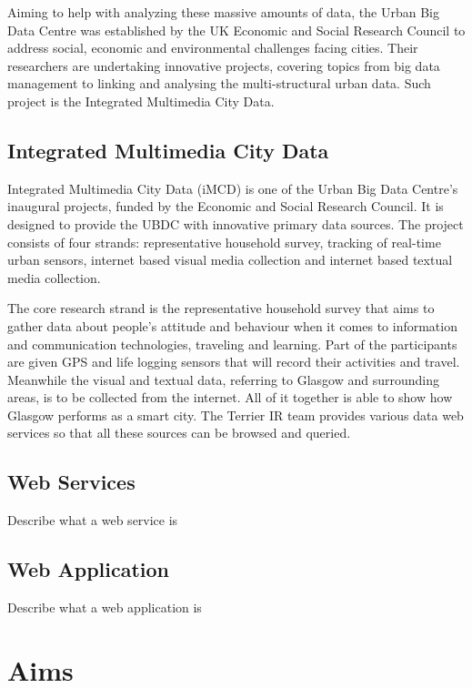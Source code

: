 \documentclass{l4proj}
\begin{document}
Aiming to help with analyzing these massive amounts of data, the Urban Big Data Centre was established by the UK Economic and Social Research Council to address social, economic and environmental challenges facing cities. Their researchers are undertaking innovative projects, covering topics from big data management to linking and analysing the multi-structural urban data.  Such project is the Integrated Multimedia City Data. 



\subsection{Integrated Multimedia City Data\cite{imcd}}


Integrated Multimedia City Data (iMCD) is one of the Urban Big Data Centre’s inaugural projects, funded by the Economic and Social Research Council. It is designed to provide the UBDC with innovative primary data sources. The project consists of four strands: representative household survey, tracking of real-time urban sensors, internet based visual media collection and internet based textual media collection.  

The core research strand is the representative household survey that aims to gather data about people’s attitude and behaviour when it comes to information and communication technologies, traveling and learning. Part of the participants are given GPS and life logging sensors that will record their activities and travel. Meanwhile the visual and textual data, referring to Glasgow and surrounding areas, is to be collected from the internet. All of it together is able to show how Glasgow performs as a smart city.  The Terrier IR team provides various data web services so that all these sources can be browsed and queried.


\subsection{Web Services}

Describe what a web service is

\subsection{Web Application}

Describe what a web application is

\section{Aims}
\end{document}
